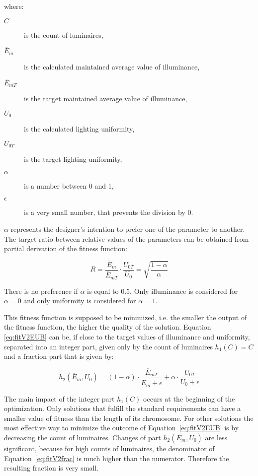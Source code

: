 \noindent where:
\begin{description}
	\item[$C$] is the count of luminaires,
	\item[$\overline{E}_{m}$] is the calculated maintained average value of illuminance,
	\item[$\overline{E}_{mT}$] is the target maintained average value of illuminance,
	\item[$U_0$] is the calculated lighting uniformity,
	\item[$U_{0T}$] is the target lighting uniformity,
	\item[$\alpha$] is a number between 0 and 1,
	\item[$\epsilon$] is a very small number, that prevents the division by 0.
\end{description}

$\alpha$ represents the designer's intention to prefer one of the parameter to another. The target ratio between relative values of the parameters can be obtained from partial derivation of the fitness function:

\begin{equation}
\label{eq:fitV2ratio}
R =\frac{\overline{E}_{m}}{\overline{E}_{mT}}\cdot\frac{U_{0T}}{U_0}=\sqrt{\frac{1-\alpha}{\alpha}}
\end{equation}

\noindent There is no preference if $\alpha$ is equal to $0.5$. Only illuminance is considered for $\alpha = 0$ and only uniformity is considered for $\alpha = 1$.

This fitness function is supposed to be minimized, i.e. the smaller the output of the fitness function, the higher the quality of the solution. Equation \ref{eq:fitV2EUB} can be, if close to the target values of illuminance and uniformity, separated into an integer part, given only by the count of luminaires $h_1\left(C\right)= C$ and a fraction part that is given by:

\begin{equation}
\label{eq:fitV2frac}
	h_2\left(\overline{E}_{m}, U_0\right)= \left( 1 - \alpha\right)\cdot\frac{\overline{E}_{mT}}{\overline{E}_{m}+\epsilon} + \alpha\cdot\frac{U_{0T}}{U_0 + \epsilon}
\end{equation}

The main impact of the integer part $h_1\left(C\right)$ occurs at the beginning of the optimization. Only solutions that fulfill the standard requirements can have a smaller value of fitness than the length of its chromosome. For other solutions the most effective way to minimize the outcome of Equation~\ref{eq:fitV2EUB} is by decreasing the count of luminaires. Changes of part $h_2\left(\overline{E}_{m}, U_0\right)$ are less significant, because for high counts of luminaires, the denominator of Equation~\ref{eq:fitV2frac} is much higher than the numerator. Therefore the resulting fraction is very small.

